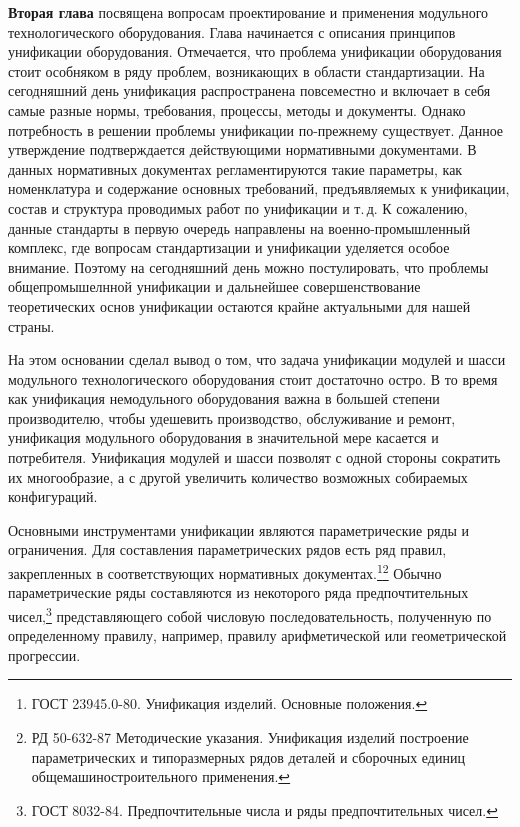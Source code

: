 \textbf{Вторая глава} посвящена вопросам проектирование и применения модульного технологического оборудования. Глава начинается с описания принципов унификации оборудования. Отмечается, что проблема унификации оборудования стоит особняком в ряду проблем, возникающих в области стандартизации. На сегодняшний день унификация распространена повсеместно и включает в себя самые разные нормы, требования, процессы, методы и документы. Однако потребность в решении проблемы унификации по-прежнему существует. Данное утверждение подтверждается действующими нормативными документами. В данных нормативных документах регламентируются такие параметры, как номенклатура и содержание основных требований, предъявляемых к унификации, состав и структура проводимых работ по унификации и т.\,д. К сожалению, данные стандарты в первую очередь направлены на военно-промышленный комплекс, где вопросам стандартизации и унификации уделяется особое внимание. Поэтому на сегодняшний день можно постулировать, что проблемы общепромышелнной унификации и дальнейшее совершенствование теоретических основ унификации остаются крайне актуальными для нашей страны. 

На этом основании сделал вывод о том, что задача унификации модулей и шасси модульного технологического оборудования стоит достаточно остро. В то время как унификация немодульного оборудования важна в большей степени производителю, чтобы удешевить производство, обслуживание и ремонт, унификация модульного оборудования в значительной мере касается и потребителя. Унификация модулей и шасси позволят с одной стороны сократить их многообразие, а с другой увеличить количество возможных собираемых конфигураций. 

Основными инструментами унификации являются параметрические ряды и ограничения. Для составления параметрических рядов есть ряд правил, закрепленных в соответствующих нормативных документах.\footnote{ГОСТ 23945.0-80. Унификация изделий. Основные положения.}\footnote{РД 50-632-87 Методические указания. Унификация изделий построение параметрических и типоразмерных рядов деталей и сборочных единиц общемашиностроительного применения.} Обычно параметрические ряды составляются из некоторого ряда предпочтительных чисел,\footnote{ГОСТ 8032-84. Предпочтительные числа и ряды предпочтительных чисел.} представляющего собой числовую последовательность, полученную по определенному правилу, например, правилу арифметической или геометрической прогрессии.

